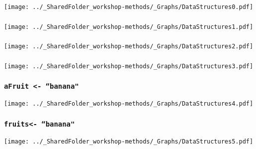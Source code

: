 \documentclass{beamer}
\begin{document}
    \begin{frame}
        \frametitle{} \vspace{0.7cm}
        \begin{center}
            \texttt{[image: ../\_SharedFolder\_workshop-methods/\_Graphs/DataStructures0.pdf]}
        \end{center}
    \end{frame}

    \begin{frame}
        \frametitle{} \vspace{0.7cm}
        \begin{center}
            \texttt{[image: ../\_SharedFolder\_workshop-methods/\_Graphs/DataStructures1.pdf]}
        \end{center}
    \end{frame}

    \begin{frame}
        \frametitle{} \vspace{0.7cm}
        \begin{center}
            \texttt{[image: ../\_SharedFolder\_workshop-methods/\_Graphs/DataStructures2.pdf]}
        \end{center}
    \end{frame}

    \begin{frame}
        \frametitle{} \vspace{0.7cm}
        \begin{center}
            \texttt{[image: ../\_SharedFolder\_workshop-methods/\_Graphs/DataStructures3.pdf]}
        \end{center}
    \end{frame}

    \begin{frame}
        \frametitle{\texttt{aFruit <- ``banana"}} \vspace{0.6cm}
        \begin{center}
            \texttt{[image: ../\_SharedFolder\_workshop-methods/\_Graphs/DataStructures4.pdf]}
        \end{center}
    \end{frame}

    \begin{frame}
        \frametitle{\texttt{fruits\rbrack <- ``banana"}} \vspace{0.6cm}
        \begin{center}
            \texttt{[image: ../\_SharedFolder\_workshop-methods/\_Graphs/DataStructures5.pdf]}
        \end{center}
    \end{frame}
\end{document}
